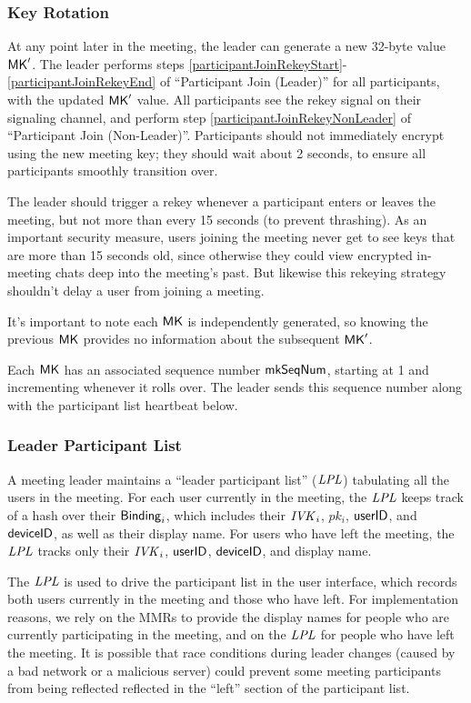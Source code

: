 \subsubsection{Key Rotation}

At any point later in the meeting, the leader can generate a new 32-byte value ${\sf MK}'$. The leader performs steps \ref{participantJoinRekeyStart}-\ref{participantJoinRekeyEnd} of ``Participant Join (Leader)'' for all participants, with the updated ${\sf MK}'$ value. All participants see the rekey signal on their signaling channel, and perform step \ref{participantJoinRekeyNonLeader} of ``Participant Join (Non-Leader)''.  Participants should not immediately encrypt using the new meeting key; they should wait about 2 seconds, to ensure all participants smoothly transition over.

The leader should trigger a rekey whenever a participant enters or leaves the meeting, but not more than every 15 seconds (to prevent thrashing). As an important security measure, users joining the meeting never get to see keys that are more than 15 seconds old, since otherwise they could view encrypted in-meeting chats deep into the meeting's past. But likewise this rekeying strategy shouldn't delay a user from joining a meeting.

It's important to note each ${\sf MK}$ is independently generated, so knowing the previous ${\sf MK}$ provides no information about the subsequent ${\sf MK}'$.

Each ${\sf MK}$ has an associated sequence number $\mathsf{mkSeqNum}$, starting at 1 and incrementing whenever it rolls over. The leader sends this sequence number along with the participant list heartbeat below.

\subsubsection{Leader Participant List}

A meeting leader maintains a ``leader participant list'' ($\mathit{LPL}$) tabulating all the users in the meeting. For each user currently in the meeting, the $\mathit{LPL}$ keeps track of a hash over their ${\sf Binding}_i$, which includes their $\mathit{IVK}_i$, $pk_i$, $\mathsf{userID}$, and ${\sf deviceID}$, as well as their display name. For users who have left the meeting, the $\mathit{LPL}$ tracks only their $\mathit{IVK}_i$, $\mathsf{userID}$, ${\sf deviceID}$, and display name.

The $\mathit{LPL}$ is used to drive the participant list in the user interface, which records both users
currently in the meeting and those who have left. For implementation reasons, we rely on the MMRs to
provide the display names for people who are currently participating in the meeting, and on the
$\mathit{LPL}$ for people who have left the meeting. It is possible that race conditions during leader
changes (caused by a bad network or a malicious server) could prevent some meeting participants from
being reflected reflected in the ``left'' section of the participant list.

